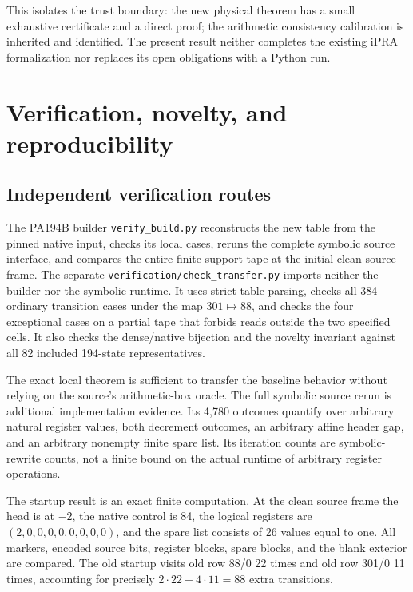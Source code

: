 \documentclass[11pt]{article}
\newcommand{\file}[1]{\nolinkurl{#1}}
\begin{document}
This isolates the trust boundary: the new physical theorem has a small
exhaustive certificate and a direct proof; the arithmetic consistency
calibration is inherited and identified. The present result neither
completes the existing iPRA formalization nor replaces its open obligations
with a Python run.



\section{Verification, novelty, and reproducibility}
\label{sec:verification}
\subsection{Independent verification routes}
The PA194B builder \file{verify_build.py} reconstructs the new table from the
pinned native input, checks its local cases, reruns the complete symbolic
source interface, and compares the entire finite-support tape at the
initial clean source frame. The separate
\file{verification/check_transfer.py} imports neither the builder nor the
symbolic runtime. It uses strict table parsing, checks all 384 ordinary
transition cases under the map \(301\mapsto88\), and checks the four
exceptional cases on a partial tape that forbids reads outside the two
specified cells. It also checks the dense/native bijection and the novelty
invariant against all 82 included 194-state representatives.



The exact local theorem is sufficient to transfer the baseline behavior
without relying on the source's arithmetic-box oracle. The full symbolic
source rerun is additional implementation evidence. Its 4,780 outcomes
quantify over arbitrary natural register values, both decrement outcomes,
an arbitrary affine header gap, and an arbitrary nonempty finite spare
list. Its iteration counts are symbolic-rewrite counts, not a finite bound
on the actual runtime of arbitrary register operations.

The startup result is an exact finite computation. At the clean source
frame the head is at \(-2\), the native control is 84, the logical registers
are \((2,0,0,0,0,0,0,0,0)\), and the spare list consists of 26 values equal
to one. All markers, encoded source bits, register blocks, spare blocks,
and the blank exterior are compared. The old startup visits old row 88/0
22 times and old row 301/0 11 times, accounting for precisely
\(2\cdot22+4\cdot11=88\) extra transitions.
\end{document}
